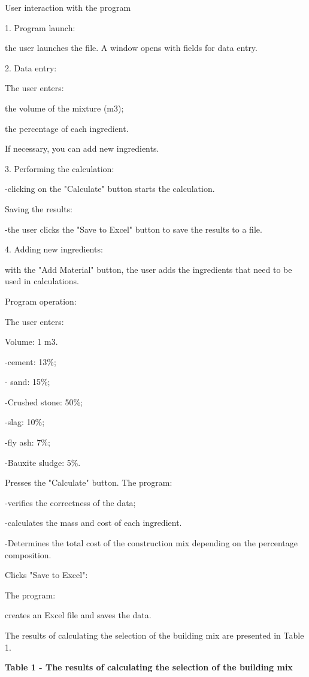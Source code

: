 \begin{multicols}{2}
User interaction with the program

1. Program launch:

the user launches the file. A window opens with fields for data entry.

2. Data entry:

The user enters:

the volume of the mixture (m3);

the percentage of each ingredient.

If necessary, you can add new ingredients.

3. Performing the calculation:

-clicking on the "Calculate" button starts the calculation.

Saving the results:

-the user clicks the "Save to Excel" button to save the results to a
file.

4. Adding new ingredients:

with the "Add Material" button, the user adds the ingredients that need
to be used in calculations.

Program operation:

The user enters:

Volume: 1 m3.

-cement: 13\%;

- sand: 15\%;

-Crushed stone: 50\%;

-slag: 10\%;

-fly ash: 7\%;

-Bauxite sludge: 5\%.

Presses the "Calculate" button. The program:

-verifies the correctness of the data;

-calculates the mass and cost of each ingredient.

-Determines the total cost of the construction mix depending on the
percentage composition.

Clicks "Save to Excel":

The program:

creates an Excel file and saves the data.

The results of calculating the selection of the building mix are
presented in Table 1.
\end{multicols}

{\bfseries Table 1 - The results of calculating the selection of the building mix}


